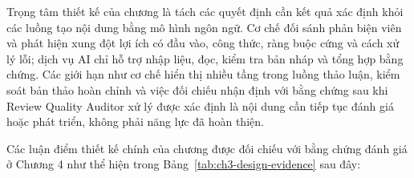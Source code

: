 Trọng tâm thiết kế của chương là tách các quyết định cần kết quả xác định khỏi các luồng tạo nội dung bằng mô hình ngôn ngữ. Cơ chế đối sánh phản biện viên và phát hiện xung đột lợi ích có đầu vào, công thức, ràng buộc cứng và cách xử lý lỗi; dịch vụ AI chỉ hỗ trợ nhập liệu, đọc, kiểm tra bản nháp và tổng hợp bằng chứng. Các giới hạn như cơ chế hiển thị nhiều tầng trong luồng thảo luận, kiểm soát bản thảo hoàn chỉnh và việc đối chiếu nhận định với bằng chứng sau khi Review Quality Auditor xử lý được xác định là nội dung cần tiếp tục đánh giá hoặc phát triển, không phải năng lực đã hoàn thiện.

Các luận điểm thiết kế chính của chương được đối chiếu với bằng chứng đánh giá ở Chương 4 như thể hiện trong Bảng~\ref{tab:ch3-design-evidence} sau đây:

\begingroup
\setlength{\tabcolsep}{2pt}
\renewcommand{\arraystretch}{1.15}
